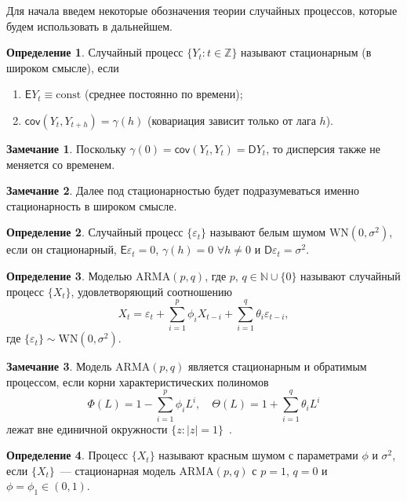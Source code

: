 \documentclass[specialist,
substylefile = spbu_report.rtx,
subf,12pt]{disser}
\theoremstyle{definition}
\newtheorem{definition}{Определение}[chapter]
\newtheorem{remark}{Замечание}[chapter]
\newcommand{\const}{\mathrm{const}}
\begin{document}
Для начала введем некоторые обозначения теории случайных процессов, которые будем использовать в дальнейшем.
\begin{definition}\label{def:stationary}
	Случайный процесс $\{Y_t:t\in\mathbb{Z}\}$ называют стационарным (в широком смысле), если
	\begin{enumerate}
		\item $\mathsf{E}Y_t\equiv\const$ (среднее постоянно по времени);
		\item $\mathsf{cov}(Y_t,Y_{t+h})=\gamma(h)$ (ковариация зависит только от лага $h$).
	\end{enumerate}
\end{definition}
\begin{remark}
	Поскольку $\gamma(0)=\mathsf{cov}(Y_t,Y_t)=\mathsf{D}Y_t$, то дисперсия также не меняется со временем.
\end{remark}
\begin{remark}
	Далее под стационарностью будет подразумеваться именно стационарность в широком смысле.
\end{remark}
\begin{definition}
	Случайный процесс $\{\varepsilon_t\}$ называют белым шумом $\mathrm{WN}(0, \sigma^2)$, если он стационарный, $\mathsf{E}\varepsilon_t=0$, $\gamma(h)=0$ $\forall h\ne 0$ и $\mathsf{D}\varepsilon_t=\sigma^2$.
\end{definition}

\begin{definition}
	Моделью $\mathrm{ARMA}(p, q)$, где $p$, $q\in \mathbb{N}\cup\{0\}$ называют случайный процесс $\{X_t\}$, удовлетворяющий соотношению
	\[
		X_t=\varepsilon_t + \sum_{i=1}^p \phi_i X_{t-i} + \sum_{i=1}^q\theta_i\varepsilon_{t-i},
	\]
	где $\{\varepsilon_t\}\sim\mathrm{WN}(0, \sigma^2)$.
\end{definition}
\begin{remark}
	Модель $\mathrm{ARMA}(p, q)$ является стационарным и обратимым процессом, если корни характеристических полиномов
	\[
		\Phi(L)=1-\sum_{i=1}^p \phi_i L^i,\quad \Theta(L)=1+\sum_{i=1}^q \theta_i L^i
	\]
	лежат вне единичной окружности $\{z:|z|=1\}$~\cite[Section 3.4.1]{BoxJenkins2016}.
\end{remark}

\begin{definition}
	Процесс $\{X_t\}$ называют красным шумом с параметрами $\phi$ и $\sigma^2$, если $\{X_t\}$~--- стационарная модель $\mathrm{ARMA}(p, q)$ с $p=1$, $q=0$ и $\phi=\phi_1\in(0, 1)$.
\end{definition}
\end{document}
